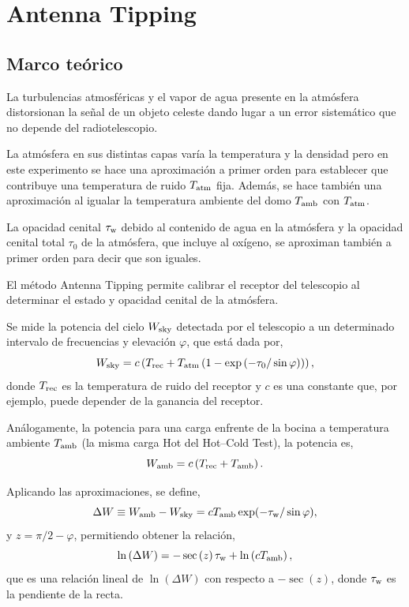 \section{Antenna Tipping}

\subsection{Marco teórico}

La turbulencias atmosféricas y el vapor de agua presente en la atmósfera distorsionan la señal de un objeto celeste dando lugar a un error sistemático que no depende del radiotelescopio.

La atmósfera en sus distintas capas varía la temperatura y la densidad pero en este experimento se hace una aproximación a primer orden para establecer que contribuye una temperatura de ruido $T_\textnormal{atm}$ fija. Además, se hace también una aproximación al igualar la temperatura ambiente del domo $T_\textnormal{amb}$ con $T_\textnormal{atm}$.

La opacidad cenital $\tau_\textnormal{w}$ debido al contenido de agua en la atmósfera y la opacidad cenital total $\tau_0$ de la atmósfera, que incluye al oxígeno, se aproximan también a primer orden para decir que son iguales.

El método Antenna Tipping permite calibrar el receptor del telescopio al determinar el estado y opacidad cenital de la atmósfera.

Se mide la potencia del cielo $W_\textnormal{sky}$ detectada por el telescopio a un determinado intervalo de frecuencias y elevación $\varphi$, que está dada por,
\begin{equation}
W_\textnormal{sky}=c\left(T_\textnormal{rec}+T_\textnormal{atm}\left(1-\exp\left(-\tau_\textnormal{0}/\sin\varphi\right)\right)\right)
,\end{equation}
donde $T_\textnormal{rec}$ es la temperatura de ruido del receptor y $c$ es una constante que, por ejemplo, puede depender de la ganancia del receptor.

Análogamente, la potencia para una carga enfrente de la bocina a temperatura ambiente $T_\textnormal{amb}$ (la misma carga Hot del Hot--Cold Test), la potencia es,
\begin{equation}
W_\textnormal{amb}=c\left(T_\textnormal{rec}+T_\textnormal{amb}\right)
.\end{equation}

Aplicando las aproximaciones, se define,
\begin{equation}
\Delta W\equiv W_\textnormal{amb}-W_\textnormal{sky}=cT_\textnormal{amb}\exp(-\tau_\textnormal{w}/\sin\varphi)\label{eq:deltaw}
,\end{equation}
y $z=\pi/2-\varphi$, permitiendo obtener la relación,
\begin{equation}
\ln\left(\Delta W\right)=-\sec\left(z\right)\tau_\textnormal{w}+\ln\left(cT_\textnormal{amb}\right)\label{eq:taufit}
,\end{equation}
que es una relación lineal de $\ln(\Delta W)$ con respecto a ${-\sec\left(z\right)}$, donde $\tau_\textnormal{w}$ es la pendiente de la recta.

